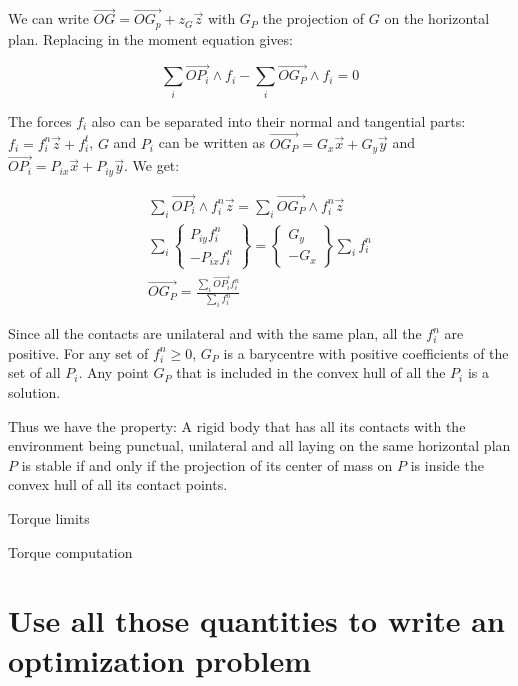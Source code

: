We can write $\overrightarrow{OG} = \overrightarrow{OG_p} + z_G\vec{z}$ with $G_P$ the projection of $G$ on the horizontal plan. Replacing in the moment equation gives:

\begin{equation}
  \sum\limits_i \overrightarrow{OP_i}\wedge f_i - \sum\limits_i\overrightarrow{OG_P} \wedge f_i = 0
\end{equation}

The forces $f_i$ also can be separated into their normal and tangential parts: $f_i = f_i^n\vec{z} + f_i^t$, $G$ and $P_i$ can be written as $\overrightarrow{OG_P} = G_x \vec{x} + G_y\vec{y}$ and $\overrightarrow{OP_i} = P_{ix} \vec{x} + P_{iy} \vec{y}$. We get:

\begin{align}
  \sum\limits_i \overrightarrow{OP_i}\wedge f_i^n\vec{z} = \sum\limits_i\overrightarrow{OG_P} \wedge f_i^n\vec{z} \\
\sum\limits_i \left\{\begin{array}{r} P_{iy}f_i^n\\-P_{ix}f_i^n\end{array}\right\}
= \left\{\begin{array}{r} G_{y}\\-G_{x}\end{array}\right\} \sum\limits_if_i^n\\
  \overrightarrow{OG_P} = \frac{\sum\limits_i \overrightarrow{OP_i} f_i^n}{\sum\limits_if_i^n}
\end{align}

Since all the contacts are unilateral and with the same plan, all the $f_i^n$ are positive.
For any set of $f_i^n\geq0$, $G_P$ is a barycentre with positive coefficients of the set of all $P_i$.
Any point $G_P$ that is included in the convex hull of all the $P_i$ is a solution.

Thus we have the property: A rigid body that has all its contacts with the environment being punctual, unilateral and all laying on the same horizontal plan $P$ is stable if and only if the projection of its center of mass on $P$ is inside the convex hull of all its contact points.



Torque limits

Torque computation

\section{Use all those quantities to write an optimization problem}
\label{sec:use_all_those_quantities_to_write_an_optimization_problem}

